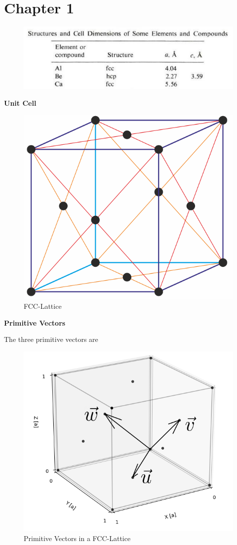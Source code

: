 \section{Chapter 1}

\begin{figure}[H]
	\centering
	\includegraphics[width=0.7\linewidth]{Graphics/Chapter1/StructuresAndCellDimension_Table1_2_Omar}
	\caption{}
	\label{}
\end{figure}


\textbf{Unit Cell}
\begin{figure}[H]
	\centering
	\includegraphics[width=0.4\linewidth]{Graphics/Chapter1/face-centered_cubic_lattice.png}
	\caption{FCC-Lattice}
	\label{}
\end{figure}

\textbf{Primitive Vectors}

The three primitive vectors are

\begin{figure}[H]
	\centering
	\includegraphics[width=0.5\linewidth]{Graphics/Chapter1/prim_vec}
	\caption{Primitive Vectors in a FCC-Lattice}
	\label{}
\end{figure}

